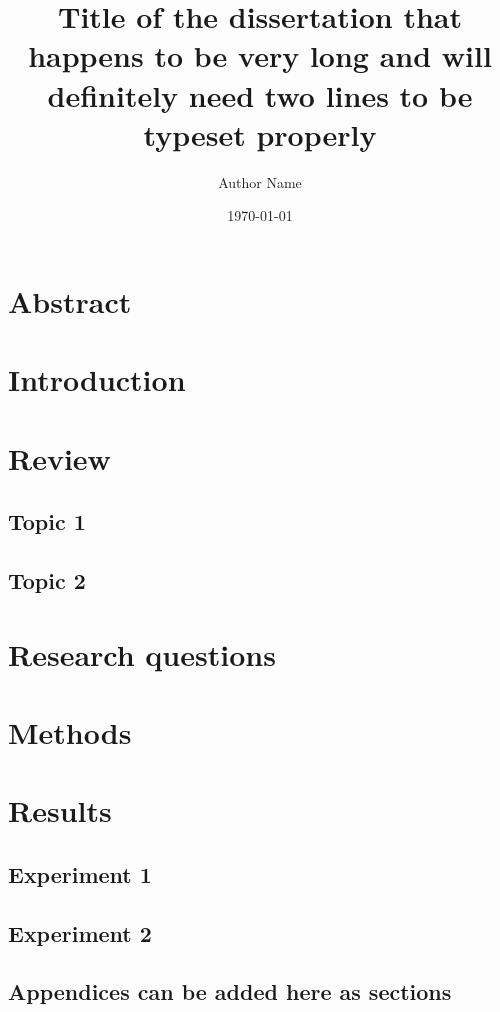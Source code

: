 \documentclass{uhthesis}
\title{Title of the dissertation that happens to be very long and will definitely need two lines to be typeset properly}
\author{Author Name}
\date{\today}
\begin{document}
\maketitle
\tableofcontents
\newpage

\section{Abstract}
\section{Introduction}
\section{Review}
    \subsection{Topic 1}
    \subsection{Topic 2}
\section{Research questions}
\section{Methods}
\section{Results}
    \subsection{Experiment 1}
    \subsection{Experiment 2}

\begin{appendices}
    \section{Appendices can be added here as sections}
\end{appendices}
\end{document}
